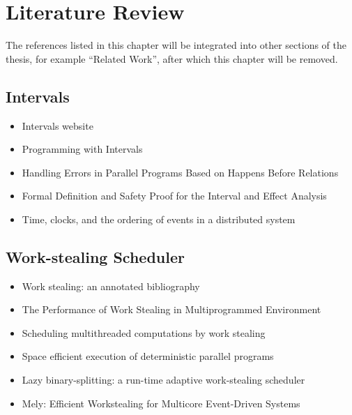 
\chapter{Literature Review}
\label{cha:literature-review}

The references listed in this chapter will be integrated into other
sections of the thesis, for example ``Related Work'', after which this
chapter will be removed.

\section{Intervals}
\label{sec:lr-intervals}

\begin{itemize}
\item Intervals website \cite{Matsakis2010}
\item Programming with Intervals \cite{Matsakis2009b}
\item Handling Errors in Parallel Programs Based on Happens Before
  Relations \cite{Matsakis2010a}
\item Formal Definition and Safety Proof for the Interval and Effect
  Analysis \cite{Matsakis2009}
\item Time, clocks, and the ordering of events in a distributed system
  \cite{Lamport1978}
\end{itemize}


\section{Work-stealing Scheduler}
\label{sec:lr-work-stealing-scheduler}

\begin{itemize}
\item Work stealing: an annotated bibliography \cite{Neill2001}
\item The Performance of Work Stealing in Multiprogrammed Environment
  \cite{Blumofe1998a}
\item Scheduling multithreaded computations by work stealing
  \cite{Blumofe1999}
\item Space efficient execution of deterministic parallel programs
  \cite{Simpson1999}
\item Lazy binary-splitting: a run-time adaptive work-stealing
  scheduler \cite{Tzannes2010}
\item Mely: Efficient Workstealing for Multicore Event-Driven Systems
  \cite{Gaud2010}
\end{itemize}


